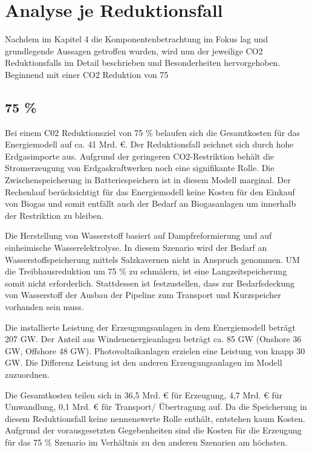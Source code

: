 \section{Analyse je Reduktionsfall}
\label{sec:reduktionsfälle}
Nachdem im Kapitel 4 die Komponentenbetrachtung im Fokus lag und grundlegende Aussagen getroffen wurden, wird nun der jeweilige CO2 Reduktionsfalls im Detail beschrieben und Besonderheiten hervorgehoben. Beginnend mit einer CO2 Reduktion von 75 %

\subsection{75 \%}
Bei einem C02 Reduktionsziel von 75 \% belaufen sich die Gesamtkosten für das Energiemodell auf ca. 41 Mrd. €. Der Reduktionsfall zeichnet sich durch hohe Erdgasimporte aus. Aufgrund der geringeren CO2-Restriktion behält die Stromerzeugung von Erdgaskraftwerken noch eine signifikante Rolle. Die Zwischenspeicherung in Batteriespeichern ist in diesem Modell marginal. Der Rechenlauf berücksichtigt für das Energiemodell keine Kosten für den Einkauf von Biogas und somit entfällt auch der Bedarf an Biogasanlagen um innerhalb der Restriktion zu bleiben. 

Die Herstellung von Wasserstoff basiert auf Dampfreformierung und auf einheimische Wasserelektrolyse. In diesem Szenario wird der Bedarf an Wasserstoffspeicherung mittels Salzkavernen nicht in Anspruch genommen. UM die Treibhausreduktion um 75 \% zu schmälern, ist eine Langzeitspeicherung somit nicht erforderlich. Stattdessen ist festzustellen, dass zur Bedarfsdeckung von Wasserstoff der Ausbau der Pipeline zum Transport und Kurzspeicher vorhanden sein muss. 

Die installierte Leistung der Erzeugungsanlagen in dem Energiemodell beträgt 207 GW.  Der Anteil aus Windenenergieanlagen beträgt ca. 85 GW (Onshore 36 GW, Offshore 48 GW). Photovoltaikanlagen erzielen eine Leistung von knapp 30 GW. Die Differenz Leistung ist den anderen Erzeugungsanlagen im Modell zuzuordnen. 

Die Gesamtkosten teilen sich in 36,5 Mrd. € für Erzeugung, 4,7 Mrd. € für Umwandlung, 0,1 Mrd. € für Transport/ Übertragung auf. Da die Speicherung in diesem Reduktionsfall keine nennenswerte Rolle enthält, entstehen kaum Kosten. Aufgrund der vorausgesetzten Gegebenheiten sind die Kosten für die Erzeugung für das 75 \% Szenario im Verhältnis zu den anderen Szenarien am höchsten. 

